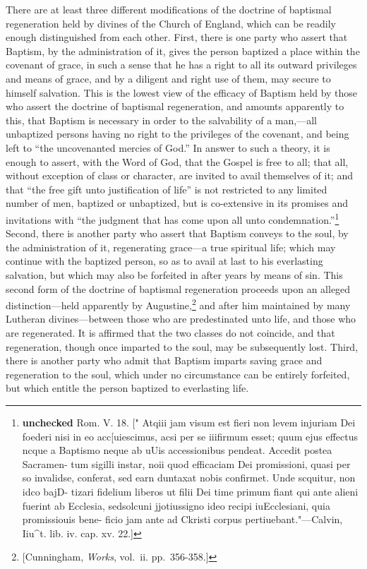 \documentclass[]{book}
\begin{document}
There are at least three different modifications of the doctrine of baptismal regeneration held by divines of the Church of England, which can be readily enough distinguished from each other. First, there is one party who assert that Baptism, by the administration of it, gives the person baptized a place within the covenant of grace, in such a sense that he has a right to all its outward privileges and means of grace, and by a diligent and right use of them, may secure to himself salvation. This is the lowest view of the efficacy of Baptism held by those who assert the doctrine of baptismal regeneration, and amounts apparently to this, that Baptism is necessary in order to the salvability of a man,---all unbaptized persons having no right to the privileges of the covenant, and being left to ``the uncovenanted mercies of God.'' In answer to such a theory, it is enough to assert, with the Word of God, that the Gospel is free to all; that all, without exception of class or character, are invited to avail themselves of it; and that ``the free gift unto justification of life'' is not restricted to any limited number of men, baptized or unbaptized, but is co-extensive in its promises and invitations with ``the judgment that has come upon all unto condemnation.''\footnote{\textbf{unchecked} Rom. V. 18. {[}" Atqiii jam visum est fieri non levem injuriam Dei foederi nisi in eo acc{[}uiescimus, acsi per se iiifirmum esset; quum ejus effectus ncque a Baptismo neque ab uUis accessionibus pendeat. Accedit postea Sacramen- tum sigilli instar, noii quod efficaciam Dei promissioni, quasi per so invalidse, conferat, sed earn duntaxat nobis confirmet. Unde scquitur, non idco bajD- tizari fidelium liberos ut filii Dei time primum fiant qui ante alieni fuerint ab Ecclesia, sedsolcuni jjotiussigno ideo recipi iuEcclesiani, quia promissiouis bene- ficio jam ante ad Ckristi corpus pertiuebant."---Calvin, Iiu\^{}t. lib. iv. cap. xv. 22.{]}} Second, there is another party who assert that Baptism conveys to the soul, by the administration of it, regenerating grace---a true spiritual life; which may continue with the baptized person, so as to avail at last to his everlasting salvation, but which may also be forfeited in after years by means of sin. This second form of the doctrine of baptismal regeneration proceeds upon an alleged distinction---held apparently by Augustine,\footnote{{[}Cunningham, \emph{Works}, vol.~ii. pp.~356-358.{]}} and after him maintained by many Lutheran divines---between those who are predestinated unto life, and those who are regenerated. It is affirmed that the two classes do not coincide, and that regeneration, though once imparted to the soul, may be subsequently lost. Third, there is another party who admit that Baptism imparts saving grace and regeneration to the soul, which under no circumstance can be entirely forfeited, but which entitle the person baptized to everlasting life.
\end{document}
